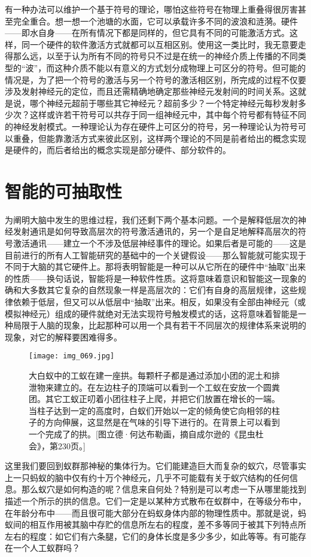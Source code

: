 有一种办法可以维护一个基于符号的理论，哪怕这些符号在物理上重叠得很厉害甚至完全重合。想一想一个池塘的水面，它可以承载许多不同的波浪和涟漪。硬件——即水自身——在所有情况下都是同样的，但它具有不同的可能激活方式。这样，同一个硬件的软件激活方式就都可以互相区别。使用这一类比时，我无意要走得那么远，以至于认为所有不同的符号只不过是在统一的神经介质上传播的不同类型的“波”，而这种介质不能以有意义的方式划分成物理上可区分的符号。但可能的情况是，为了把一个符号的激活与另一个符号的激活相区别，所完成的过程不仅要涉及发射神经元的定位，而且还需精确地确定那些神经元发射间的时间关系。这就是说，哪个神经元超前于哪些其它神经元？超前多少？一个特定神经元每秒发射多少次？这样或许若干符号可以共存于同一组神经元中，其中每个符号都有特征不同的神经发射模式。一种理论认为存在硬件上可区分的符号，另一种理论认为符号可以重叠，但能靠激活方式来彼此区别，这样两个理论的不同是前者给出的概念实现是硬件的，而后者给出的概念实现是部分硬件、部分软件的。

\section{智能的可抽取性}

为阐明大脑中发生的思维过程，我们还剩下两个基本问题。一个是解释低层次的神经发射通讯是如何导致高层次的符号激活通讯的，另一个是自足地解释高层次的符号激活通讯——建立一个不涉及低层神经事件的理论。如果后者是可能的——这是目前进行的所有人工智能研究的基础中的一个关键假设——那么智能就可能实现于不同于大脑的其它硬件上。那将表明智能是一种可以从它所在的硬件中“抽取”出来的性质——换句话说，智能将是一种软件性质。这将意味着意识和智能这一现象的确和大多数其它复杂的自然现象一样是高层次的：它们有自身的高层规律，这些规律依赖于低层，但又可以从低层中“抽取”出来。相反，如果没有全部由神经元（或模拟神经元）组成的硬件就绝对无法实现符号触发模式的话，这将意味着智能是一种局限于人脑的现象，比起那种可以用一个具有若干不同层次的规律体系来说明的现象，对它的解释要困难得多。

\begin{figure}
\texttt{[image: img\_069.jpg]}
\caption[结队的工蚁在建一座拱。]
  {大白蚁中的工蚁在建一座拱。每颗杆子都是通过添加小团的泥土和排泄物来建立的。在左边柱子的顶端可以看到一个工蚁在安放一个圆粪团。其它工蚁正叨着小团往柱子上爬，并把它们放置在增长的一端。当柱子达到一定的高度时，白蚁们开始以一定的倾角使它向相邻的柱子的方向伸展，这显然是在气味的引导下进行的。在背景上可以看到一个完成了的拱。[图立德·何达布勒画，摘自成尔逊的《昆虫杜会》，第230页。] }
\end{figure}

这里我们要回到蚁群那神秘的集体行为。它们能建造巨大而复杂的蚁穴，尽管事实上一只蚂蚁的脑中仅有约十万个神经元，几乎不可能载有关于蚁穴结构的任何信息。那么蚁穴是如何构造的呢？信息来自何处？特别是可以考虑一下从哪里能找到描述一个所示的拱的信息。它们一定是以某种方式散布在蚁群中，在等级分布中，在年龄分布中——而且很可能大部分在蚂蚁身体内部的物理性质中。那就是说，蚂蚁间的相互作用被其脑中存贮的信息所左右的程度，差不多等同于被其下列特点所左右的程度：如它们有六条腿，它们的身体长度是多少多少，如此等等。有可能存在一个人工蚁群吗？

